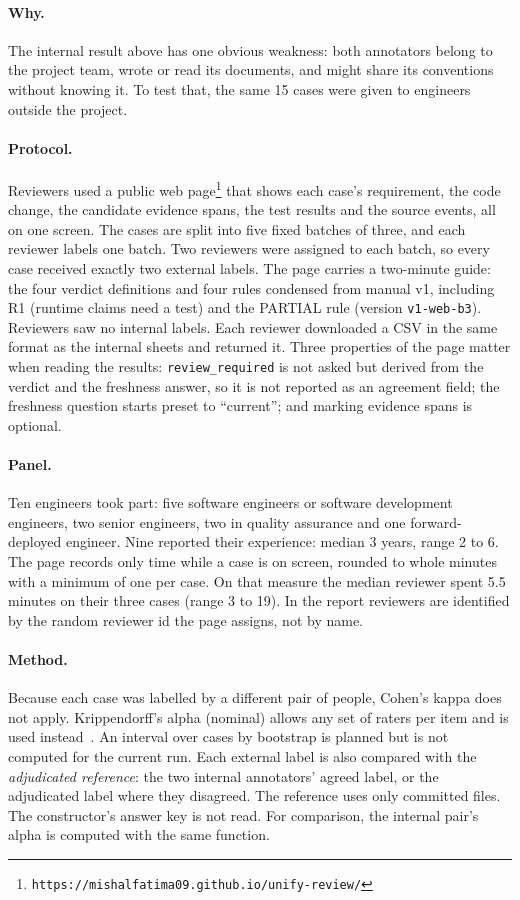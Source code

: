 \paragraph{Why.} The internal result above has one obvious weakness: both
annotators belong to the project team, wrote or read its documents, and might
share its conventions without knowing it. To test that, the same 15 cases were
given to engineers outside the project.

\paragraph{Protocol.} Reviewers used a public web
page\footnote{\texttt{https://mishalfatima09.github.io/unify-review/}} that shows each case's
requirement, the code change, the candidate evidence spans, the test results
and the source events, all on one screen. The cases are split into five fixed
batches of three, and each reviewer labels one batch. Two reviewers were
assigned to each batch, so every case received exactly two external labels. The
page carries a two-minute guide: the four verdict definitions and four rules
condensed from manual v1, including R1 (runtime claims need a test) and the
PARTIAL rule (version \texttt{v1-web-b3}). Reviewers saw no internal
labels. Each reviewer downloaded a CSV in the same format as the internal sheets
and returned it. Three properties of the page matter when reading the results:
\texttt{review\_required} is not asked but derived from the verdict and the
freshness answer, so it is not reported as an agreement field; the freshness
question starts preset to ``current''; and marking evidence spans is
optional.

\paragraph{Panel.} Ten engineers took part: five software engineers or
software development engineers, two senior engineers, two in quality assurance
and one forward-deployed engineer. Nine reported their experience: median 3
years, range 2 to 6. The page records only time while a case is on screen,
rounded to whole minutes with a minimum of one per case. On that measure the
median reviewer spent 5.5 minutes on their three cases (range 3 to 19). In the
report reviewers are identified by the random reviewer id the page assigns, not
by name.

\paragraph{Method.} Because each case was labelled by a different pair of
people, Cohen's kappa does not apply. Krippendorff's alpha (nominal) allows any
set of raters per item and is used instead~\cite{krippendorff2018}. An interval
over cases by bootstrap is planned but is not computed for the current run. Each external label is also
compared with the \emph{adjudicated reference}: the two internal annotators'
agreed label, or the adjudicated label where they disagreed. The reference uses
only committed files. The constructor's answer key is not read. For comparison,
the internal pair's alpha is computed with the same function.


